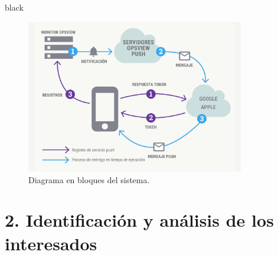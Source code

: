 \documentclass[
11pt, %
]{charter}
\begin{document}
\begin{consigna}{black}

\begin{figure}[htpb]
\centering 
\includegraphics[width=0.85\textwidth]{./Figuras/diagBloques.png}
\caption{Diagrama en bloques del sistema.}
\label{fig:diagBloques}
\end{figure}

\vspace{25px}

\end{consigna}


\section{2. Identificación y análisis de los interesados}
\label{sec:interesados}
\end{document}
